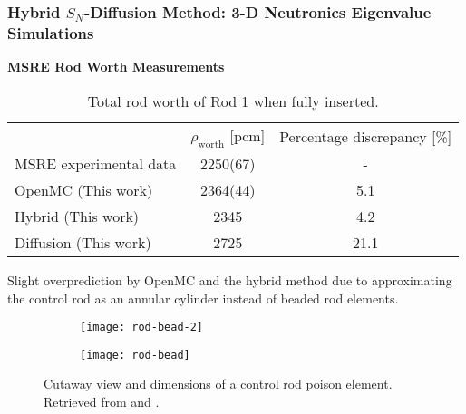 \begin{frame}
  \frametitle{Hybrid $S_N$-Diffusion Method: 3-D Neutronics Eigenvalue Simulations}
  \textbf{MSRE Rod Worth Measurements}
  \begin{table}[t]
    \centering
    \caption{Total rod worth of Rod 1 when fully inserted.}
    \small
    \begin{tabular}{l S[table-format=4(2)] S}
      \toprule
       & {$\rho_\text{worth}$ [pcm]} & {Percentage discrepancy [\%]}\\
       \cmidrule(rl){2-2} \cmidrule(l){3-3}
      \gls{MSRE} experimental data & 2250(67) & {-}\\
      OpenMC (This work) & 2364(44) & 5.1 \\
      Hybrid (This work) & 2345 & 4.2 \\
      Diffusion (This work) & 2725 & 21.1 \\
      \bottomrule
    \end{tabular}
    \label{table:rod-worth}
  \end{table}
  \vspace{.2cm}

  Slight overprediction by OpenMC and the hybrid method due to approximating the control rod
  as an annular cylinder instead of beaded rod elements.
  \begin{figure}[t]
    \begin{subfigure}[b]{0.22\columnwidth}
      \centering
      \texttt{[image: rod-bead-2]}
    \end{subfigure}
    \begin{subfigure}[b]{0.44\columnwidth}
      \centering
      \texttt{[image: rod-bead]}
    \end{subfigure}
    \caption{Cutaway view and dimensions of a control rod poison element. Retrieved from
    \cite{tolson_msre_1967} and \cite{robertson_msre_1965}.}
    \label{fig:rod-bead}
  \end{figure}
\end{frame}

